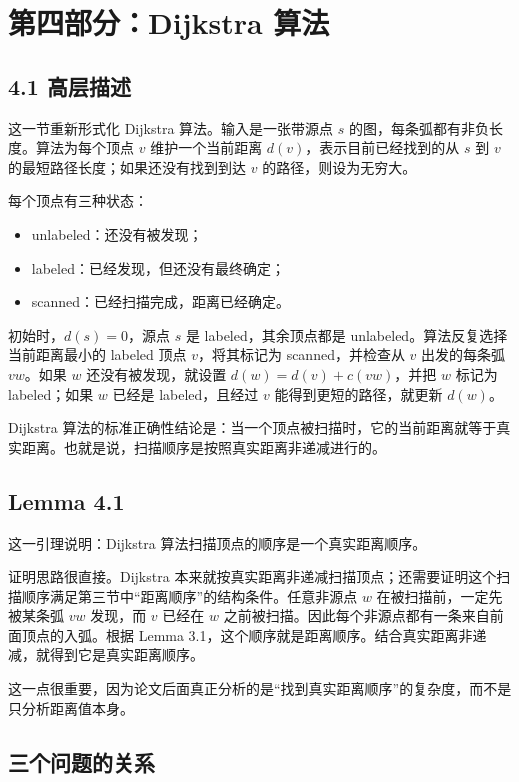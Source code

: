 \documentclass[UTF8]{ctexart}
\begin{document}
\section*{第四部分：Dijkstra 算法}

\subsection*{4.1 高层描述}

这一节重新形式化 Dijkstra 算法。输入是一张带源点 \(s\) 的图，每条弧都有非负长度。算法为每个顶点 \(v\) 维护一个当前距离 \(d(v)\)，表示目前已经找到的从 \(s\) 到 \(v\) 的最短路径长度；如果还没有找到到达 \(v\) 的路径，则设为无穷大。

每个顶点有三种状态：

\begin{itemize}
  \item unlabeled：还没有被发现；
  \item labeled：已经发现，但还没有最终确定；
  \item scanned：已经扫描完成，距离已经确定。
\end{itemize}

初始时，\(d(s)=0\)，源点 \(s\) 是 labeled，其余顶点都是 unlabeled。算法反复选择当前距离最小的 labeled 顶点 \(v\)，将其标记为 scanned，并检查从 \(v\) 出发的每条弧 \(vw\)。如果 \(w\) 还没有被发现，就设置 \(d(w)=d(v)+c(vw)\)，并把 \(w\) 标记为 labeled；如果 \(w\) 已经是 labeled，且经过 \(v\) 能得到更短的路径，就更新 \(d(w)\)。

Dijkstra 算法的标准正确性结论是：当一个顶点被扫描时，它的当前距离就等于真实距离。也就是说，扫描顺序是按照真实距离非递减进行的。

\subsection*{Lemma 4.1}

这一引理说明：Dijkstra 算法扫描顶点的顺序是一个真实距离顺序。

证明思路很直接。Dijkstra 本来就按真实距离非递减扫描顶点；还需要证明这个扫描顺序满足第三节中“距离顺序”的结构条件。任意非源点 \(w\) 在被扫描前，一定先被某条弧 \(vw\) 发现，而 \(v\) 已经在 \(w\) 之前被扫描。因此每个非源点都有一条来自前面顶点的入弧。根据 Lemma 3.1，这个顺序就是距离顺序。结合真实距离非递减，就得到它是真实距离顺序。

这一点很重要，因为论文后面真正分析的是“找到真实距离顺序”的复杂度，而不是只分析距离值本身。

\subsection*{三个问题的关系}
\end{document}
